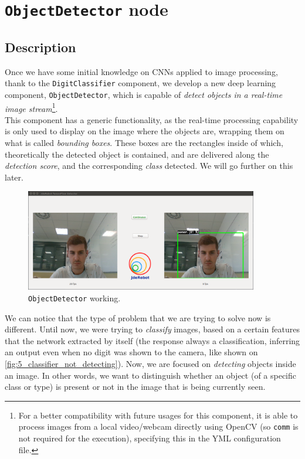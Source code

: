 \chapter{\texttt{ObjectDetector} node}

\section{Description}
	Once we have some initial knowledge on CNNs applied to image processing, thank to the \texttt{DigitClassifier} component, we develop a new deep learning component, \texttt{ObjectDetector}, which is capable of \emph{detect objects in a real-time image stream}\footnote{For a better compatibility with future usages for this component, it is able to process images from a local video/webcam directly using OpenCV (so \texttt{comm} is not required for the execution), specifying this in the YML configuration file.}.\\

	This component has a generic functionality, as the real-time processing capability is only used to display on the image where the objects are, wrapping them on what is called \emph{bounding boxes}. These boxes are the rectangles inside of which, theoretically the detected object is contained, and are delivered along the \emph{detection score}, and the corresponding \emph{class} detected. We will go further on this later.\\
	\begin{figure}[h]
		\centering
		\includegraphics[width=4in]{images/objectdetector}
		\caption{\texttt{ObjectDetector} working.}
		\label{fig:5_objectdetector}
	\end{figure}
	
	We can notice that the type of problem that we are trying to solve now is different. Until now, we were trying to \emph{classify} images, based on a certain features that the network extracted by itself (the response always a classification, inferring an output even when no digit was shown to the camera, like shown on \autoref{fig:5_classifier_not_detecting}). Now, we are focused on \emph{detecting} objects inside an image. In other words, we want to distinguish whether an object (of a specific class or type) is present or not in the image that is being currently seen.
	
